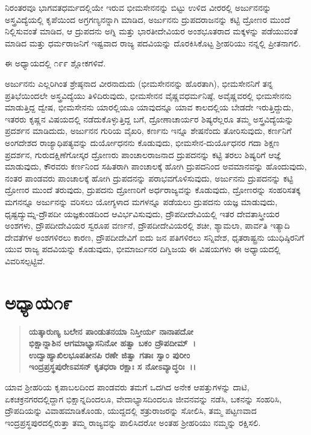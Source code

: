 \vskip 2pt

ನಿರಂತರವೂ ಭಾಗವತಧರ್ಮದಲ್ಲಿಯೇ ಇರುವ ಭೀಮಸೇನನನ್ನು ಬಿಟ್ಟು ಉಳಿದ ವೀರರಲ್ಲಿ ಅರ್ಜುನನನ್ನು ಅಸ್ತ್ರವಿದ್ಯೆಯಲ್ಲಿ ಕೃಪೆಯಿಂದ ಅಗ್ರಗಣ್ಯನನ್ನಾಗಿ ಮಾಡಿದ, ಅರ್ಜುನನು ದ್ರುಪದರಾಜನನ್ನು ಕಟ್ಟಿ ದ್ರೋಣರ ಮುಂದೆ ನಿಲ್ಲಿಸುವಂತೆ ಮಾಡಿದ, ಆ ದ್ರುಪದನು ಅಗ್ನಿ ಮತ್ತು ಭಾರತೀದೇವಿಯರ ಅಂಶಭೂತರಾದ ಮಕ್ಕಳನ್ನು ಪಡೆಯುವಂತೆ ಮಾಡಿದ ಮತ್ತು ಧರ್ಮರಾಜನಿಗೆ ಇಷ್ಟವಾದ ರಾಜ್ಯ ಪದವಿಯನ್ನು ದೊರಕಿಸಿಕೊಟ್ಟ ಶ‍್ರೀಹರಿಯು ನನ್ನಲ್ಲಿ ಪ್ರೀತನಾಗಲಿ.

ಈ ಅಧ್ಯಾಯದಲ್ಲಿ ೧೯೯ ಶ್ಲೋಕಗಳಿವೆ.

ಅರ್ಜುನನು ಎಲ್ಲರಿಗಿಂತ ಶ್ರೇಷ್ಠನಾದ ವೀರನಾದುದು (ಭೀಮಸೇನನನ್ನು ಹೊರತಾಗಿ), ಭೀಮಸೇನನಿಗೆ ತನ್ನ ಪ್ರತಿಭೆಯಿಂದಲೇ ಅಸ್ತ್ರವಿದ್ಯೆಯು ತಿಳಿದಿರುವುದು, ಭೀಮಸೇನನ ವೈಷ್ಣವಧರ್ಮನಿಷ್ಠೆ, ಅವೈಷ್ಣವರಲ್ಲಿ ಭೀಮಸೇನನು ಮಾಡುತ್ತಿದ್ದ ದ್ವೇಷ, ಭೀಮಸೇನನು ಯಾರಲ್ಲಿಯೂ ಯಾವುದನ್ನೂ ಯಾವ ಕಾಲದಲ್ಲಿಯ ಬೇಡದೇ ಇರುತ್ತಿದ್ದುದು, ಇತರರು ಕೃಷ್ಣನ ವಿಷಯದಲ್ಲಿ ನಡೆದುಕೊಳ್ಳುತ್ತಿದ್ದ ಬಗೆ, ದ್ರೋಣಾಚಾರ್ಯರ ಶಿಷ್ಯರೆಲ್ಲರೂ ತಮ್ಮ ಅಸ್ತ್ರವಿದ್ಯೆಯನ್ನು ಪ್ರದರ್ಶನ ಮಾಡಿದುದು, ಅರ್ಜುನನ ಗುರಿಯ ವೈಖರಿ, ಕರ್ಣನು ಇನ್ನೂ ಶೇಷನೆಂದು ತೋರಿಸುವುದು, ಕರ್ಣನಿಗೆ ಅಂಗದೇಶದ ರಾಜ್ಯಾಧಿಪತ್ಯವನ್ನು ದುರ್ಯೋಧನನು ಕೊಡುವುದು, ಭೀಮಸೇನ-ದುರ್ಯೊಧನರ ಗದಾ ಶಿಕ್ಷಣ ಪ್ರದರ್ಶನ, ಗುರುದಕ್ಷಿಣೆಗೋಸ್ಕರ ದ್ರೋಣರು ಪಾಂಚಾಲರಾಜನಾದ ದ್ರುಪದನನ್ನು ಕಟ್ಟಿ ತರಲು ಶಿಷ್ಯರಿಗೆ ಆಜ್ಞೆ ಮಾಡುವುದು, ಕೌರವರು ಕರ್ಣನಿಂದ ಸಹಿತರಾಗಿ ಪಾಂಚಾಲಕ್ಕೆ ಹೋಗಿ ದ್ರುಪದನಿಂದ ಅವಮಾನವನ್ನು ಹೊಂದುವುದು, ನಂತರ ಪಾಂಡವರು ಪಾಂಚಾಲಕ್ಕೆ ಹೋಗಿ ದ್ರುಪದನನ್ನು ಪರಾಭವಗೊಳಿಸುವುದು, ಅರ್ಜುನನು ದ್ರುಪದನನ್ನು ಕಟ್ಟಿ ದ್ರೋಣರ ಮುಂದೆ ತರುವುದು, ದ್ರುಪದನು ದ್ರೋಣರಿಗೆ ಅರ್ಧರಾಜ್ಯವನ್ನು ಕೊಡುವುದು, ದ್ರೋಣರನ್ನು ಸಂಹರಿಸತಕ್ಕ ಮಗನನ್ನೂ ಅರ್ಜುನನ್ನು ವರಿಸಲು ಯೋಗ್ಯಳಾದ ಮಗಳನ್ನೂ ಪಡೆಯಲು ದ್ರುಪದನು ಯಜ್ಞ ಮಾಡು\-ವುದು, ಧೃಷ್ಟದ್ಯುಮ್ನ-ದ್ರೌಪದೀ ಯಜ್ಞಕುಂಡದಿಂದ ಆವಿರ್ಭವಿಸುವುದು, ದ್ರೌಪದೀದೇವಿಯಲ್ಲಿ ಇತರ ದೇವತಾಸ್ತ್ರೀಯರ ಅಂಶಗಳು, ದ್ರೌಪದೀದೇವಿಯರ ಸ್ವರೂಪ ವರ್ಣನೆ, ದ್ರೌಪದೀದೇವಿಯರಲ್ಲಿ ಶಚೀ, ಶ್ಯಾಮಲಾ, ಪಾರ್ವತಿ ಇತ್ಯಾದಿ ದೇವತೆಗಳ ಅಂಶಗಳಿರಲು ಕಾರಣ, ದ್ರೌಪದೀದೇವಿಗೆ ಐದು ಜನ ಪತಿಗಳಿರಲು ಸನ್ನಿವೇಶ, ಧೃತರಾಷ್ಟ್ರನು ಯುಧಿಷ್ಠಿರನಿಗೆ ಯುವ ರಾಜ್ಯ ಪದವಿಯನ್ನು ಕೊಡುವುದು, ಭೀಮಾರ್ಜುನರ ದಿಗ್ವಿಜಯ ಈ ವಿಷಯಗಳು ಈ ಅಧ್ಯಾಯದಲ್ಲಿ ವಿವರಿಸಲ್ಪಟ್ಟಿವೆ.


\section*{ಅಧ್ಯಾಯ\enginline{-}೧೯}

\begin{verse}
\textbf{ಯತ್ಕಾರುಣ್ಯ ಬಲೇನ ಪಾಂಡುತನಯಾ ನಿಸ್ತೀರ್ಯ ನಾನಾಪದೋ}\\\textbf{ಭಿಕ್ಷಾನ್ನಾಶಿನ ಆಗಮಾಭ್ಯಾಸನಿನೋ ಹತ್ವಾ ಬಕಂ ದ್ರೌಪದೀಮ್~।}\\\textbf{ಉದ್ವಾಹ್ಯಾಖಿಲಭೂಪತೀನಪಿ ರಣೇ ಜಿತ್ವಾ ಗತಾಃ ಸ್ವಾಂ ಪುರೀಂ} \\\textbf{ಇಂದ್ರಪ್ರಸ್ಥಪುರೇಽವಸನ್ ಕೃತಧರಾ ರಕ್ಷಾಃ ಸ ನೋಽವ್ಯಾದ್ಧರಿಃ~।।}
\end{verse}

ಯಾವ ಶ‍್ರೀಹರಿಯ ಕೃಪಾಬಲದಿಂದ ಪಾಂಡವರು ತಮಗೆ ಒದಗಿದ ಅನೇಕ ಆಪತ್ತುಗಳನ್ನು ದಾಟಿ, ಏಕಚಕ್ರನಗರದಲ್ಲಿದ್ದಾಗ ಭಿಕ್ಷಾನ್ನದಿಂದಲೂ, ವೇದಾಭ್ಯಾಸದಿಂದಲೂ ಜೀವನ\-ವನ್ನು ನಡೆಸಿ, ಬಕನನ್ನು ಸಂಹರಿಸಿ, ದ್ರೌಪದಿಯನ್ನು ವಿವಾಹಮಾಡಿಕೊಂಡು, ಯುದ್ದದಲ್ಲಿ ಶತ್ರುರಾಜರನ್ನು ಸೋಲಿಸಿ, ತಮ್ಮ ಪಟ್ಟಣವಾದ ಇಂದ್ರಪ್ರಸ್ಥಪುರದಲ್ಲಿರುತ್ತಾ ತಮ್ಮ ರಾಜ್ಯವನ್ನು ಪಾಲಿಸಿದರೋ ಅಂತಹ ಶ‍್ರೀಹರಿಯು ನಮ್ಮನ್ನು ರಕ್ಷಿಸಲಿ.

